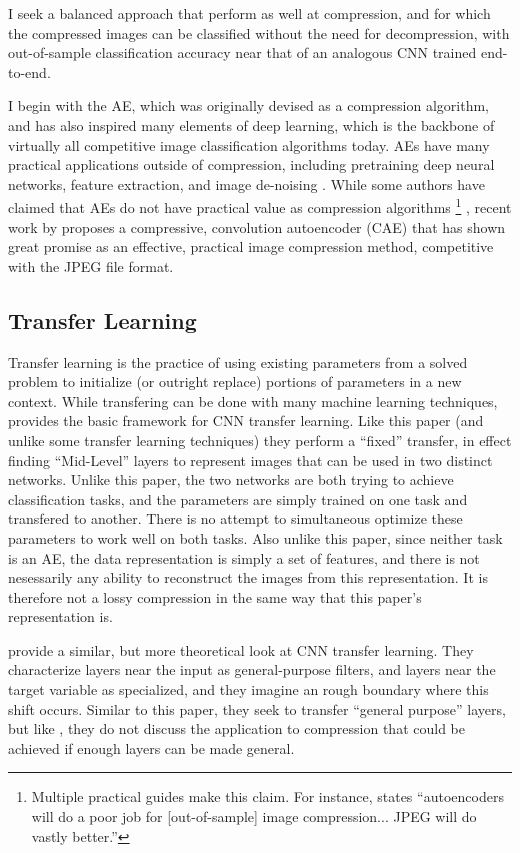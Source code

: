 \documentclass[twoside,11pt]{article}
\begin{document}
I seek a balanced approach that perform as well at compression,
and for which the compressed images 
can be classified without the need for decompression, with out-of-sample
 classification accuracy near that of an analogous CNN trained end-to-end.

I begin with the AE, which was originally 
devised as a compression algorithm, and has also inspired many elements of 
deep learning, which is the backbone of virtually all competitive image 
classification algorithms today.
AEs have many practical applications outside of compression, including 
pretraining deep neural networks, feature extraction, 
and image de-noising \citep{baldi2012autoencoders}. While some authors have claimed that AEs do 
not have practical value as compression algorithms
\footnote{
Multiple practical guides make this claim. For instance, \citet{huben2018_tds_ae} states ``autoencoders will 
do a poor job for [out-of-sample] image compression... JPEG will do vastly better.''
}
, recent work by 
\citet{theis2017} proposes a compressive, convolution autoencoder (CAE) that 
has shown great promise as an effective, practical image compression method, 
competitive with the JPEG file format.

\subsection{Transfer Learning}

Transfer learning is the practice of using existing parameters from a solved problem
to initialize (or outright replace) portions of parameters in a new context.
While transfering can be done with many machine learning techniques, \citet{oquab2014learning}
 provides the basic framework for CNN transfer learning.
Like this paper (and unlike some transfer learning techniques) they perform a 
``fixed'' transfer, in effect finding ``Mid-Level'' layers
to represent images that can be used in two distinct networks. Unlike this paper, the two
networks are both trying to achieve classification tasks, and the parameters are simply trained
on one task and transfered to another. There is no attempt to simultaneous optimize these 
parameters to work well on both tasks. Also unlike this paper, since neither task is an
AE, the data representation is simply a set of features, and there is not nesessarily any
ability to reconstruct the images from this representation. It is therefore not a lossy
compression in the same way that this paper's representation is.

\citet{yosinski2014transferable} provide a similar, but more theoretical look at 
CNN transfer learning. They characterize layers near the input as general-purpose filters,
and layers near the target variable as specialized, and they imagine an rough boundary where
this shift occurs. Similar to this paper, they seek to transfer ``general purpose'' layers,
but like \citet{oquab2014learning}, they do not discuss the application to compression that
could be achieved if enough layers can be made general.
\end{document}
